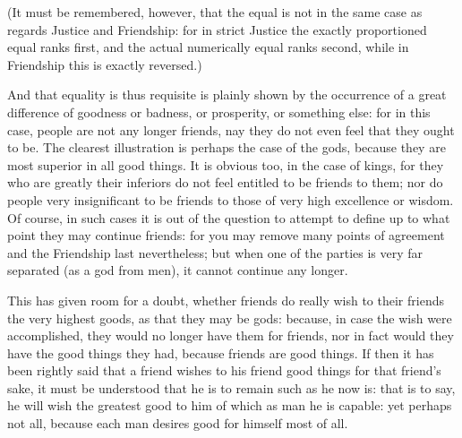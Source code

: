 (It must be remembered, however, that the equal is not in the same case as
regards Justice and Friendship: for in strict Justice the exactly proportioned
equal ranks first, and the actual numerically equal ranks second, while in
Friendship this is exactly reversed.)

And that equality is thus requisite is plainly shown by the occurrence of a
great difference of goodness or badness, or prosperity, or something else: for
in this case, people are not any longer friends, nay they do not even feel that
they ought to be. The clearest illustration is perhaps the case of the gods,
because they are most superior in all good things. It is obvious too, in the
case of kings, for they who are greatly their inferiors do not feel entitled to
be friends to them; nor do people very insignificant to be friends to those of
very high excellence or wisdom. Of course, in such cases it is out of the
question to attempt to define up to what point they may continue friends: for
you may remove many points of agreement and the Friendship last nevertheless;
but when one of the parties is very far separated (as a god from men), it
cannot continue any longer.

This has given room for a doubt, whether friends do really wish to their
friends the very highest goods, as that they may be gods: because, in case the
wish were accomplished, they would no longer have them for friends, nor in fact
would they have the good things they had, because friends are good things. If
then it has been rightly said that a friend wishes to his friend good things
for that friend’s sake, it must be understood that he is to remain such
as he now is: that is to say, he will wish the greatest good to him of which as
man he is capable: yet perhaps not all, because each man desires good for
himself most of all.

